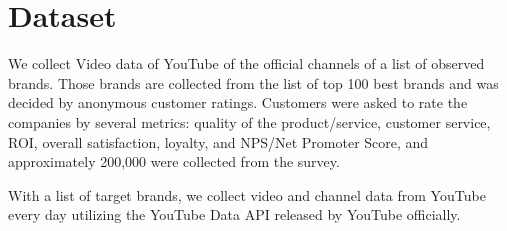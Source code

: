 \section{Dataset}

We collect Video data of YouTube of the official channels of a list of observed brands. Those brands are collected from the list of top 100 best brands and was decided by anonymous customer ratings. Customers were asked to rate the companies by several metrics: quality of the product/service, customer service, ROI, overall satisfaction, loyalty, and NPS/Net Promoter Score, and approximately 200,000 were collected from the survey.

With a list of target brands, we collect video and channel data from YouTube every day utilizing the YouTube Data API released by YouTube officially.